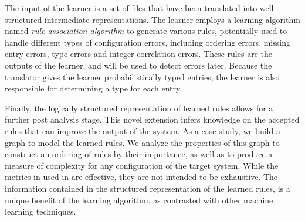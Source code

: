 The input of the learner is a set of files that have been translated
into well-structured intermediate representations. 
The learner employs a learning algorithm named {\em rule association 
algorithm} to generate various rules,
potentially used to handle different types of configuration errors,
including ordering errors, missing entry errors,
type errors and integer correlation errors.
These rules are the outputs of the learner, 
and will be used to detect errors later.
Because the translator gives the learner probabilistically typed entries,
the learner is also responsible for determining a type for each entry.

Finally, the logically structured representation of learned rules allows for a further post analysis stage.
This novel extension infers knowledge on the accepted rules that can improve the output of the system.
As a case study, we build a graph to model the learned rules.
We analyze the properties of this graph to construct an ordering of rules by their importance, 
  as well as to produce a measure of complexity for any configuration of the target system.
While the metrics in used in \app are effective, they are not intended to be exhaustive.
The information contained in the structured representation of the learned rules, 
  is a unique benefit of the learning algorithm, as contrasted with other machine learning techniques.

